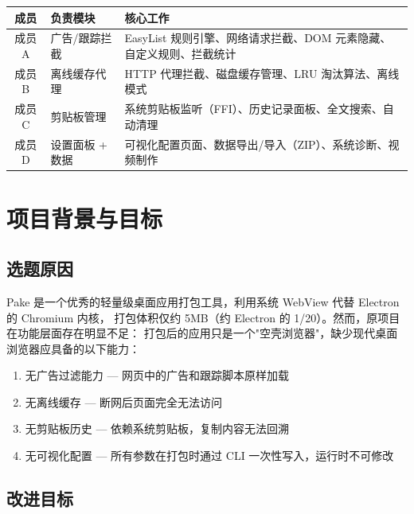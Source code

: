 \documentclass[12pt,a4paper]{ctexart}
\begin{document}
\begin{table}[h]
\centering
\small
\begin{tabularx}{\textwidth}{c>{\centering\arraybackslash}p{3.5cm}X}
\toprule
成员   & 负责模块        & 核心工作 \\
\midrule
成员 A & 广告/跟踪拦截   & EasyList 规则引擎、网络请求拦截、DOM 元素隐藏、自定义规则、拦截统计 \\
成员 B & 离线缓存代理   & HTTP 代理拦截、磁盘缓存管理、LRU 淘汰算法、离线模式 \\
成员 C & 剪贴板管理     & 系统剪贴板监听（FFI）、历史记录面板、全文搜索、自动清理 \\
成员 D & 设置面板 + 数据 & 可视化配置页面、数据导出/导入（ZIP）、系统诊断、视频制作 \\
\bottomrule
\end{tabularx}
\end{table}

\section{项目背景与目标}

\subsection{选题原因}

Pake 是一个优秀的轻量级桌面应用打包工具，利用系统 WebView 代替 Electron 的 Chromium 内核，
打包体积仅约 5MB（约 Electron 的 1/20）。然而，原项目在功能层面存在明显不足：
打包后的应用只是一个"空壳浏览器"，缺少现代桌面浏览器应具备的以下能力：

\begin{enumerate}[label=(\arabic*)]
  \item 无广告过滤能力 --- 网页中的广告和跟踪脚本原样加载
  \item 无离线缓存 --- 断网后页面完全无法访问
  \item 无剪贴板历史 --- 依赖系统剪贴板，复制内容无法回溯
  \item 无可视化配置 --- 所有参数在打包时通过 CLI 一次性写入，运行时不可修改
\end{enumerate}

\subsection{改进目标}
\end{document}
